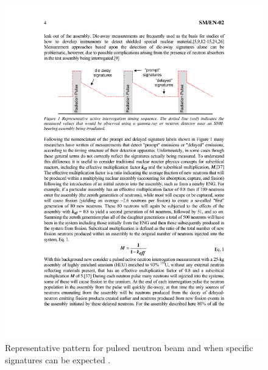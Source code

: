 \documentclass{report}
\begin{document}
\begin{figure}
 \centering
 \includegraphics[trim = 5cm 18.7cm 5cm 5cm, clip,scale=1]{./figures/Chichester_timing.pdf}
   \caption{Representative pattern for pulsed neutron beam and when specific signatures can be expected \cite{Chichester2009}.}
     \label{fig:Chichester_timing}
\end{figure}
\end{document}

